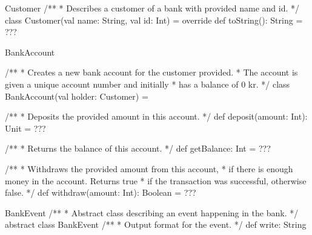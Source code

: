 \begin{ScalaSpec}{Customer}
/**
 * Describes a customer of a bank with provided name and id.
 */
class Customer(val name: String, val id: Int) = {
	override def toString(): String = ???
}

\end{ScalaSpec}


\begin{ScalaSpec}{BankAccount}

/**
 * Creates a new bank account for the customer provided.
 * The account is given a unique account number and initially
 * has a balance of 0 kr.
 */
class BankAccount(val holder: Customer) = {

  /**
   * Deposits the provided amount in this account.
   */
  def deposit(amount: Int): Unit = ???

  /**
   * Returns the balance of this account.
   */
  def getBalance: Int = ???

  /**
   * Withdraws the provided amount from this account,
   * if there is enough money in the account. Returns true
   * if the transaction was successful, otherwise false.
   */
  def withdraw(amount: Int): Boolean = ???

}
\end{ScalaSpec}


\begin{ScalaSpec}{BankEvent}
/**
 * Abstract class describing an event happening in the bank.
 */
abstract class BankEvent {
  /**
   * Output format for the event.
   */
  def write: String
}

\end{ScalaSpec}


